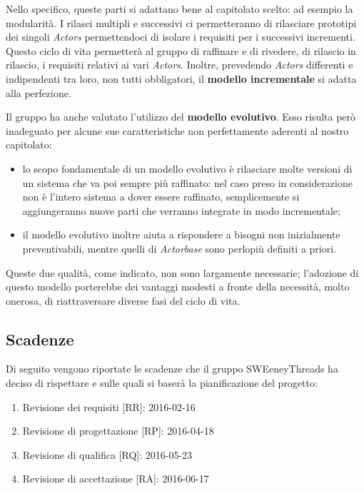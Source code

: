 \documentclass[a4paper]{article}
\begin{document}
			Nello specifico, queste parti si adattano bene al capitolato scelto: ad esempio la modularità. I rilasci 
			multipli e successivi ci permetteranno di rilasciare prototipi dei singoli \emph{Actors} permettendoci di
			isolare i requisiti per i successivi incrementi. Questo ciclo di vita permetterà al gruppo di raffinare e 
			di rivedere, di rilascio in rilascio, i requisiti relativi ai vari \emph{Actors}. Inoltre, prevedendo 
			\emph{Actors} differenti e indipendenti tra loro, non tutti obbligatori, il \textbf{modello incrementale} 
			si adatta alla perfezione.
			
			Il gruppo ha anche valutato l'utilizzo del \textbf{modello evolutivo}. Esso risulta però inadeguato per alcune sue 
			caratteristiche non perfettamente aderenti al nostro capitolato:
			\begin{itemize}
				\item lo scopo fondamentale di un modello evolutivo è rilasciare molte versioni di un sistema che va 
				poi sempre più raffinato: nel caso preso in considerazione non è l'intero sistema a dover essere raffinato, 
				semplicemente si aggiungeranno nuove parti che verranno integrate in modo incrementale;
				\item il modello evolutivo inoltre aiuta a rispondere a bisogni non inizialmente preventivabili, mentre 
				quelli di \emph{Actorbase} sono perlopiù definiti a priori.
			\end{itemize}
			Queste due qualità, come indicato, non sono largamente necessarie; l'adozione di questo modello porterebbe dei 
			vantaggi modesti a fronte della necessità, molto onerosa, di riattraversare diverse fasi del ciclo di vita.
		\subsection{Scadenze}
		\label{Scadenze}
			Di seguito vengono riportate le scadenze che il gruppo SWEeneyThreads ha deciso di rispettare e sulle quali 
			si baserà la pianificazione del progetto:
			\begin{enumerate}
				\item Revisione dei requisiti [RR]: 2016-02-16
				\item Revisione di progettazione [RP]: 2016-04-18
				\item Revisione di qualifica [RQ]: 2016-05-23
				\item Revisione di accettazione [RA]: 2016-06-17
			\end{enumerate}
			
\end{document}
